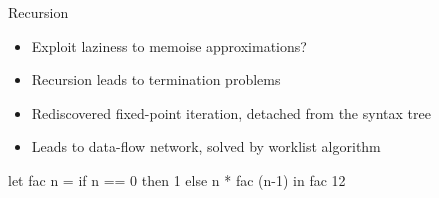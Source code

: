 \documentclass{haskellbeamer}
\begin{document}
\begin{frame}[fragile]{Recursion}
  \begin{itemize}
    \item Exploit laziness to memoise approximations?
    \item[\xmark] Recursion leads to termination problems
    \item Rediscovered fixed-point iteration, detached from the syntax tree
    \item Leads to data-flow network, solved by worklist algorithm
  \end{itemize}
  \begin{center}
    \begin{minipage}{0.5\textwidth}
      \begin{haskell}
        let fac n = 
              if n == 0
                then 1
                else n * fac (n-1)
        in fac 12
      \end{haskell}
    \end{minipage}
  \end{center}
\end{frame}
\end{document}
